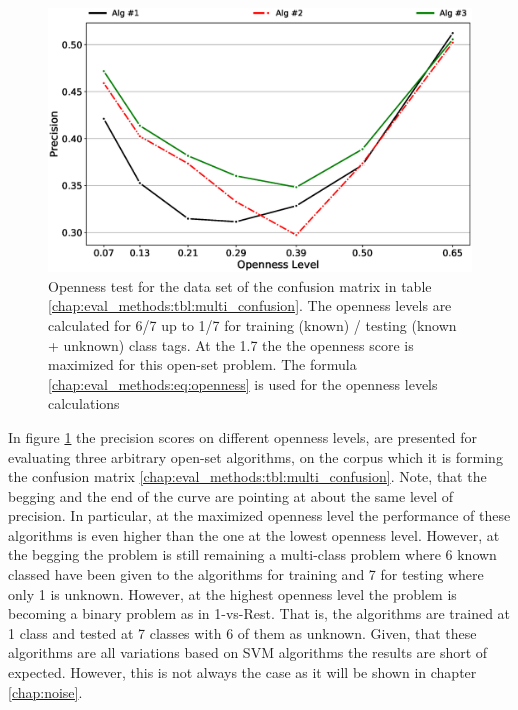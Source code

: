\begin{figure}[t]
	\begin{center}
    	\includegraphics[scale=0.50]{Figures/openness_example.eps}
		\caption{Openness test for the data set of the confusion matrix in table \ref{chap:eval_methods:tbl:multi_confusion}. The openness levels are calculated for 6/7 up to 1/7 for training (known) / testing (known + unknown) class tags. At the 1.7 the the openness score is maximized for this open-set problem. The formula \ref{chap:eval_methods:eq:openness} is used for the openness levels calculations}
		\label{chap:eval_methods:fig:openness}
	\end{center}
\end{figure}

In figure \ref{chap:eval_methods:fig:openness} the precision scores on different openness levels, are presented for evaluating three arbitrary open-set algorithms, on the corpus which it is forming the confusion matrix \ref{chap:eval_methods:tbl:multi_confusion}. Note, that the begging and the end of the curve are pointing at about the same level of precision. In particular, at the maximized openness level the performance of these algorithms is even higher than the one at the lowest openness level. However, at the begging the problem is still remaining a multi-class problem where 6 known classed have been given to the algorithms for training and 7 for testing where only 1 is unknown. However, at the highest openness level the problem is becoming a binary problem as in 1-vs-Rest. That is, the algorithms are trained at 1 class and tested at 7 classes with 6 of them as unknown. Given, that these algorithms are all variations based on SVM algorithms the results are short of expected. However, this is not always the case as it will be shown in chapter \ref{chap:noise}.


